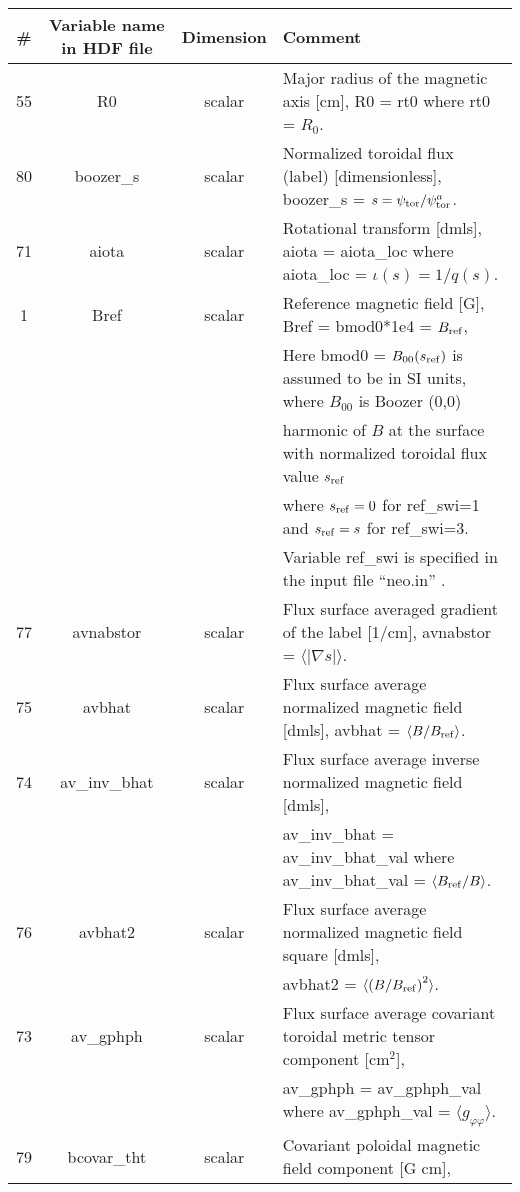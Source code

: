 \documentclass[preprint,prb,aps]{revtex4-1}
\begin{document}
\begin{table}[h]
\begin{tabular}{|c|c|c|l|}
\hline
\hline
\# & Variable name in HDF file & Dimension  & Comment \\
\hline
\hline
55 & R0 & scalar & Major radius of the magnetic axis [cm],
R0 = rt0 where rt0 = $R_0$.
\\
\hline
80 & boozer\_s & scalar & Normalized toroidal flux (label) [dimensionless],
boozer\_s = $s = \psi_{\rm tor}/\psi^a_{\rm tor}$.
\\
\hline
71 & aiota & scalar & Rotational transform [dmls], aiota = aiota\_loc where
aiota\_loc = $\iota(s)=1/q(s)$.
\\
\hline
%
1 & Bref & scalar & Reference magnetic field [G], Bref = bmod0*1e4 = $B_{\rm ref}$, \\
 & & & Here bmod0 = $B_{00}(s_{\rm ref})$ is assumed to be in SI units, where $B_{00}$ is Boozer (0,0)\\
 & & & harmonic of $B$ at the surface with normalized toroidal flux value $s_{\rm ref}$\\
 & & & where $s_{\rm ref}=0$ for ref\_swi=1 and $s_{\rm ref}=s$ for ref\_swi=3. \\
 & & & Variable ref\_swi is specified in the input file ``neo.in'' .
\\
\hline
77 & avnabstor & scalar &
Flux surface averaged gradient of the label [1/cm],
avnabstor = $\langle |\nabla s| \rangle$.
\\
\hline
75 & avbhat & scalar &
Flux surface average normalized magnetic field [dmls],
avbhat = $\langle B / B_{\rm ref}\rangle$.
\\
\hline
74 & av\_inv\_bhat & scalar & Flux surface average inverse normalized magnetic field [dmls],
\\
 & & &
av\_inv\_bhat = av\_inv\_bhat\_val where av\_inv\_bhat\_val = $\langle B_{\rm ref}/B\rangle$.
\\
\hline
76 & avbhat2 & scalar &
Flux surface average normalized magnetic field square [dmls],
\\
 & & &
avbhat2  = $\langle \left(B / B_{\rm ref}\right)^2\rangle$.
\\
\hline
73 & av\_gphph & scalar &
Flux surface average covariant toroidal metric tensor component [cm$^2$],
\\
 & & &
av\_gphph = av\_gphph\_val where av\_gphph\_val = $\langle g_{\varphi\varphi}\rangle$.
\\
\hline
79 & bcovar\_tht & scalar & Covariant poloidal magnetic field component [G cm],

\end{tabular}
\end{table}
\end{document}
